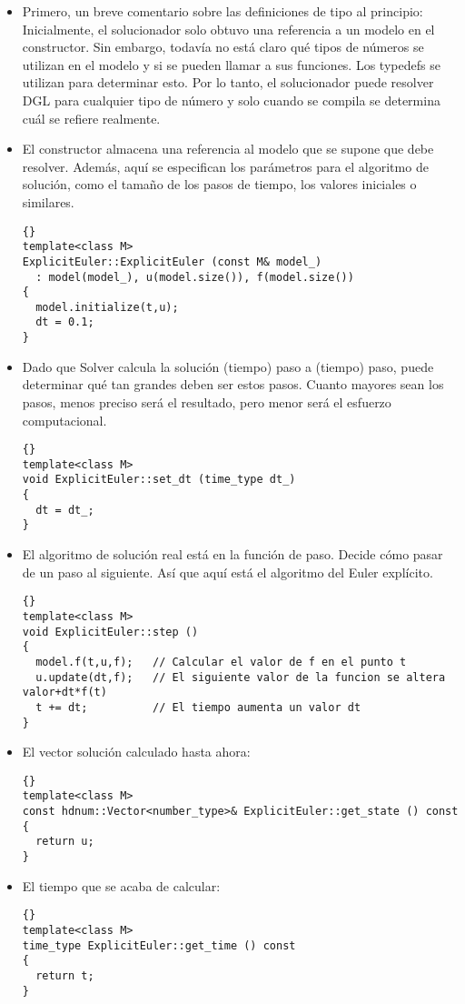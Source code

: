 \documentclass[a4paper,11pt]{article}
\theoremstyle{definition}
\begin{document}
\begin{itemize}
\item Primero, un breve comentario sobre las definiciones de tipo al principio: Inicialmente, el solucionador solo obtuvo una referencia a un modelo en el constructor. Sin embargo, todavía no está claro qué tipos de números se utilizan en el modelo y si se pueden llamar a sus funciones. Los typedefs se utilizan para determinar esto. Por lo tanto, el solucionador puede resolver DGL para cualquier tipo de número y solo cuando se compila se determina cuál se refiere realmente.

\item El constructor almacena una referencia al modelo que se supone que debe resolver. Además, aquí se especifican los parámetros para el algoritmo de solución, como el tamaño de los pasos de tiempo, los valores iniciales o similares.
{\footnotesize{\begin{lstlisting}{}
template<class M>
ExplicitEuler::ExplicitEuler (const M& model_)
  : model(model_), u(model.size()), f(model.size())
{
  model.initialize(t,u);
  dt = 0.1;
}
\end{lstlisting}}}

\item Dado que Solver calcula la solución (tiempo) paso a (tiempo) paso, puede determinar qué tan grandes deben ser estos pasos. Cuanto mayores sean los pasos, menos preciso será el resultado, pero menor será el esfuerzo computacional.

{\footnotesize{\begin{lstlisting}{}
template<class M>
void ExplicitEuler::set_dt (time_type dt_)
{
  dt = dt_;
}
\end{lstlisting}}}

\item El algoritmo de solución real está en la función de paso. Decide cómo pasar de un paso al siguiente. Así que aquí está el algoritmo del Euler explícito.

{\footnotesize{\begin{lstlisting}{}
template<class M>
void ExplicitEuler::step ()
{
  model.f(t,u,f);   // Calcular el valor de f en el punto t
  u.update(dt,f);   // El siguiente valor de la funcion se altera valor+dt*f(t)
  t += dt;          // El tiempo aumenta un valor dt 
}
\end{lstlisting}}}

\item El vector solución calculado hasta ahora:
{\footnotesize{\begin{lstlisting}{}
template<class M>
const hdnum::Vector<number_type>& ExplicitEuler::get_state () const
{
  return u;
}
\end{lstlisting}}}
\item El tiempo que se acaba de calcular:
{\footnotesize{\begin{lstlisting}{}
template<class M>
time_type ExplicitEuler::get_time () const
{
  return t;
}
\end{lstlisting}}}


\end{itemize}
\end{document}
